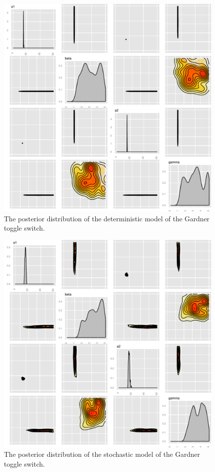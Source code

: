 \begin{figure}[p]
\centering
\includegraphics[scale=0.7 ]{chapterModelling/images/Gardner/posterior_det_high_mean.pdf}
\caption{The posterior distribution of the deterministic model of the Gardner toggle switch.}
\label{fig:Gard_post_det_high}
\end{figure}
\newpage

\begin{figure}[p]
\centering
\includegraphics[scale=0.7]{chapterModelling/images/Gardner/posterior_stch_high_mean.pdf}
\caption{The posterior distribution of the stochastic model of the Gardner toggle switch.}
\label{fig:Gard_post_stch}
\end{figure}

